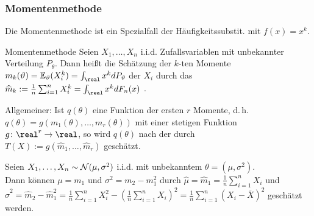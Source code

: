 \pagebreak

\subsubsection{%
    Momentenmethode%
}

\begin{Bem}
    Die Momentenmethode ist ein Spezialfall der Häufigkeitssubstit. mit $f(x) = x^k$.
\end{Bem}

\begin{Def}{Momentenmethode}
    Seien $X_1, \dotsc, X_n$ i.i.d. Zufallsvariablen mit unbekannter Verteilung $P_\theta$.
    Dann heißt die Schätzung der $k$-ten Momente
    $m_k(\theta) = \EE_\theta(X_i^k) = \int_\real x^k dP_\theta$ der $X_i$ durch
    das 
    $\widehat{m}_k := \frac{1}{n} \sum_{i=1}^n X_i^k = \int_\real x^k dF_n(x)$
    .
    
    Allgemeiner:
    Ist $q(\theta)$ eine Funktion der ersten $r$ Momente, d.\,h.
    $q(\theta) = g(m_1(\theta), \dotsc, m_r(\theta))$ mit einer stetigen Funktion
    $g\colon \real^r \rightarrow \real$,
    so wird $q(\theta)$ nach der  durch\\
    $T(X) := g(\widehat{m}_1, \dotsc, \widehat{m}_r)$ geschätzt.
\end{Def}

\linie

\begin{Bsp}
    Seien $X_1, \dotsc, X_n \sim \mathcal{N}(\mu, \sigma^2)$ i.i.d. mit unbekanntem
    $\theta = (\mu, \sigma^2)$.\\
    Dann können $\mu = m_1$ und $\sigma^2 = m_2 - m_1^2$ durch
    $\widehat{\mu} = \widehat{m}_1 = \frac{1}{n} \sum_{i=1}^n X_i$ und\\
    $\widehat{\sigma}^2 = \widehat{m}_2 - \widehat{m}_1^2 =
    \frac{1}{n} \sum_{i=1}^n X_i^2 - \left(\frac{1}{n} \sum_{i=1}^n X_i\right)^2
    = \frac{1}{n} \sum_{i=1}^n (X_i - \overline{X})^2$ geschätzt werden.
\end{Bsp}


